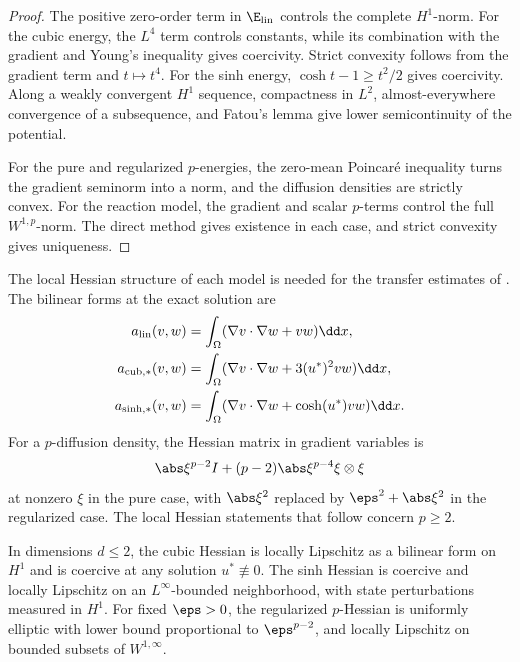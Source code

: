 \begin{proof}
The positive zero-order term in \(\E_{\rm lin}\) controls the complete \(H^1\)-norm. For the cubic
energy, the \(L^4\) term controls constants, while its combination with the gradient and Young's
inequality gives coercivity. Strict convexity follows from the gradient term and \(t\mapsto t^4\). For
the sinh energy, \(\cosh t-1\geq t^2/2\) gives coercivity. Along a weakly convergent \(H^1\) sequence,
compactness in \(L^2\), almost-everywhere convergence of a subsequence, and Fatou's lemma give lower
semicontinuity of the potential.

For the pure and regularized \(p\)-energies, the zero-mean Poincar\'e inequality turns the gradient
seminorm into a norm, and the diffusion densities are strictly convex. For the reaction model, the
gradient and scalar \(p\)-terms control the full \(W^{1,p}\)-norm. The direct method gives existence in
each case, and strict convexity gives uniqueness.
\end{proof}

The local Hessian structure of each model is needed for the transfer estimates of
. The bilinear forms at the exact solution are
\begin{align*}
 a_{\rm lin}(v,w)&=\int_\Omega(\nabla v\cdot\nabla w+vw)\dd x,\\
 a_{\rm cub,*}(v,w)&=\int_\Omega(\nabla v\cdot\nabla w+3(u^*)^2vw)\dd x,\\
 a_{\sinh,*}(v,w)&=\int_\Omega(\nabla v\cdot\nabla w+\cosh(u^*)vw)\dd x.
\end{align*}
For a \(p\)-diffusion density, the Hessian matrix in gradient variables is
\[
 \abs\xi^{p-2}I+(p-2)\abs\xi^{p-4}\xi\otimes\xi
\]
at nonzero \(\xi\) in the pure case, with \(\abs\xi^2\) replaced by
\(\eps^2+\abs\xi^2\) in the regularized case. The local Hessian statements that follow concern
\(p\geq2\).

\begin{proposition}
\label{prop:model-hessian}
In dimensions \(d\leq2\), the cubic Hessian is locally Lipschitz as a bilinear form on \(H^1\) and is coercive at any solution \(u^*\not\equiv0\). The sinh Hessian is coercive and locally Lipschitz on an \(L^\infty\)-bounded neighborhood, with state perturbations measured in \(H^1\). For fixed \(\eps>0\), the regularized \(p\)-Hessian is uniformly elliptic with lower bound proportional to \(\eps^{p-2}\), and locally Lipschitz on bounded subsets of \(W^{1,\infty}\).
\end{proposition}

